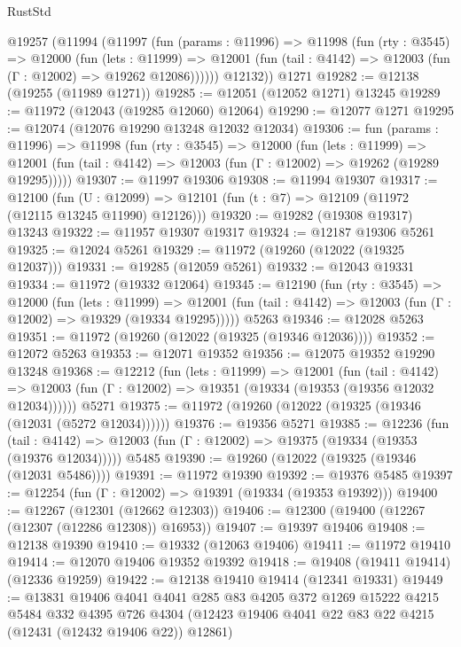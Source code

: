 \begin{lexlean}{RustStd}
\begin{coremodule}
    @19257
      (@11994
        (@11997
          (fun (params : @11996) =>
          @11998
            (fun (rty : @3545) =>
            @12000
              (fun (lets : @11999) =>
              @12001 (fun (tail : @4142) => @12003 (fun (Γ : @12002) => @19262 @12086))))))
        @12132))
    @1271
@19282 := @12138 (@19255 (@11989 @1271))
@19285 := @12051 (@12052 @1271) @13245
@19289 := @11972 (@12043 (@19285 @12060) @12064)
@19290 := @12077 @1271
@19295 := @12074 (@12076 @19290 @13248 @12032 @12034)
@19306 := fun (params : @11996) =>
  @11998
    (fun (rty : @3545) =>
    @12000
      (fun (lets : @11999) =>
      @12001 (fun (tail : @4142) => @12003 (fun (Γ : @12002) => @19262 (@19289 @19295)))))
@19307 := @11997 @19306
@19308 := @11994 @19307
@19317 := @12100
    (fun (U : @12099) => @12101 (fun (t : @7) => @12109 (@11972 (@12115 @13245 @11990) @12126)))
@19320 := @19282 (@19308 @19317) @13243
@19322 := @11957 @19307 @19317
@19324 := @12187 @19306 @5261
@19325 := @12024 @5261
@19329 := @11972 (@19260 (@12022 (@19325 @12037)))
@19331 := @19285 (@12059 @5261)
@19332 := @12043 @19331
@19334 := @11972 (@19332 @12064)
@19345 := @12190
    (fun (rty : @3545) =>
    @12000
      (fun (lets : @11999) =>
      @12001 (fun (tail : @4142) => @12003 (fun (Γ : @12002) => @19329 (@19334 @19295)))))
    @5263
@19346 := @12028 @5263
@19351 := @11972 (@19260 (@12022 (@19325 (@19346 @12036))))
@19352 := @12072 @5263
@19353 := @12071 @19352
@19356 := @12075 @19352 @19290 @13248
@19368 := @12212
    (fun (lets : @11999) =>
    @12001
      (fun (tail : @4142) =>
      @12003 (fun (Γ : @12002) => @19351 (@19334 (@19353 (@19356 @12032 @12034))))))
    @5271
@19375 := @11972 (@19260 (@12022 (@19325 (@19346 (@12031 (@5272 @12034))))))
@19376 := @19356 @5271
@19385 := @12236
    (fun (tail : @4142) => @12003 (fun (Γ : @12002) => @19375 (@19334 (@19353 (@19376 @12034)))))
    @5485
@19390 := @19260 (@12022 (@19325 (@19346 (@12031 @5486))))
@19391 := @11972 @19390
@19392 := @19376 @5485
@19397 := @12254 (fun (Γ : @12002) => @19391 (@19334 (@19353 @19392)))
@19400 := @12267 (@12301 (@12662 @12303))
@19406 := @12300 (@19400 (@12267 (@12307 (@12286 @12308)) @16953))
@19407 := @19397 @19406
@19408 := @12138 @19390
@19410 := @19332 (@12063 @19406)
@19411 := @11972 @19410
@19414 := @12070 @19406 @19352 @19392
@19418 := @19408 (@19411 @19414) (@12336 @19259)
@19422 := @12138 @19410 @19414 (@12341 @19331)
@19449 := @13831
    @19406
    @4041
    @4041
    @285
    @83
    @4205
    @372
    @1269
    @15222
    @4215
    @5484
    @332
    @4395
    @726
    @4304
    (@12423 @19406 @4041 @22 @83 @22 @4215 (@12431 (@12432 @19406 @22)) @12861)

\end{coremodule}
\end{lexlean}

